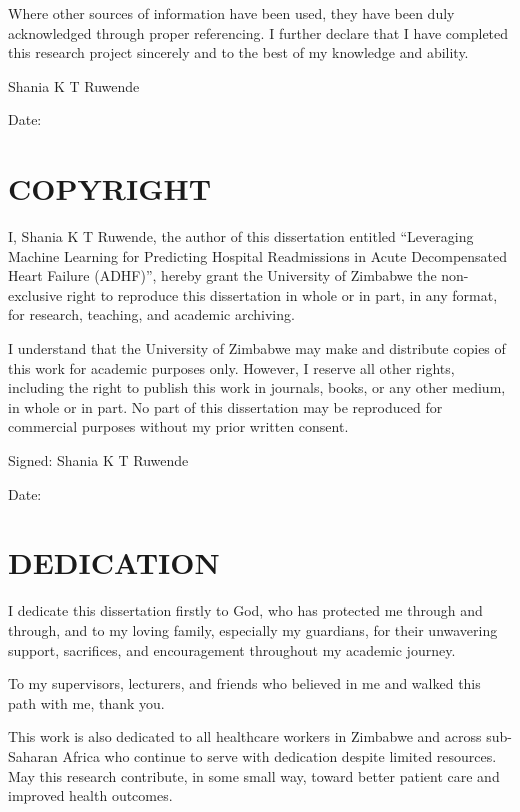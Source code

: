 \documentclass[12pt,a4paper]{report}
\begin{document}
Where other sources of information have been used, they have been duly acknowledged through proper referencing. I further declare that I have completed this research project sincerely and to the best of my knowledge and ability.

\vspace{2em}
Shania K T Ruwende

\vspace{2em}
Date: \underline{\hspace{5cm}}

\chapter*{COPYRIGHT}
I, Shania K T Ruwende, the author of this dissertation entitled ``Leveraging Machine Learning for Predicting Hospital Readmissions in Acute Decompensated Heart Failure (ADHF)'', hereby grant the University of Zimbabwe the non-exclusive right to reproduce this dissertation in whole or in part, in any format, for research, teaching, and academic archiving.

I understand that the University of Zimbabwe may make and distribute copies of this work for academic purposes only. However, I reserve all other rights, including the right to publish this work in journals, books, or any other medium, in whole or in part. No part of this dissertation may be reproduced for commercial purposes without my prior written consent.

\vspace{2em}
Signed: \underline{\hspace{5cm}} Shania K T Ruwende

\vspace{2em}
Date: \underline{\hspace{5cm}}

\chapter*{DEDICATION}
I dedicate this dissertation firstly to God, who has protected me through and through, and to my loving family, especially my guardians, for their unwavering support, sacrifices, and encouragement throughout my academic journey.

To my supervisors, lecturers, and friends who believed in me and walked this path with me, thank you.

This work is also dedicated to all healthcare workers in Zimbabwe and across sub-Saharan Africa who continue to serve with dedication despite limited resources. May this research contribute, in some small way, toward better patient care and improved health outcomes.
\end{document}
